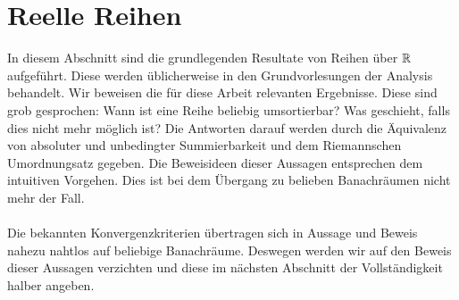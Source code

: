 \section{Reelle Reihen}
In diesem Abschnitt sind die grundlegenden Resultate von Reihen über $ \mathbb{R} $ aufgeführt.
Diese werden üblicherweise in den Grundvorlesungen der Analysis behandelt.
Wir beweisen die für diese Arbeit relevanten Ergebnisse. 
Diese sind grob gesprochen:
Wann ist eine Reihe beliebig umsortierbar? Was geschieht, falls dies nicht mehr möglich ist?
Die Antworten darauf werden durch die Äquivalenz von absoluter und unbedingter Summierbarkeit und dem Riemannschen Umordnungsatz gegeben.
Die Beweisideen dieser Aussagen entsprechen dem intuitiven Vorgehen. Dies ist bei dem Übergang zu belieben Banachräumen nicht mehr der Fall.\\
\\
Die bekannten Konvergenzkriterien übertragen sich in Aussage und Beweis nahezu nahtlos auf beliebige Banachräume. Deswegen werden wir auf den Beweis dieser Aussagen verzichten und diese im nächsten Abschnitt der Vollständigkeit halber angeben.


